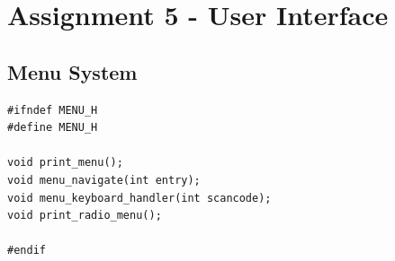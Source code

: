 \documentclass[../main.tex]{subfiles}
\begin{document}
\section{Assignment 5 - User Interface}
\label{apx:assignment_5___user_interface}


\subsection{Menu System}
\label{apx:menu_system}


\label{lst:menu_h}
\begin{verbatim}
#ifndef MENU_H
#define MENU_H

void print_menu();
void menu_navigate(int entry);
void menu_keyboard_handler(int scancode);
void print_radio_menu();

#endif

\end{verbatim}
\end{document}
